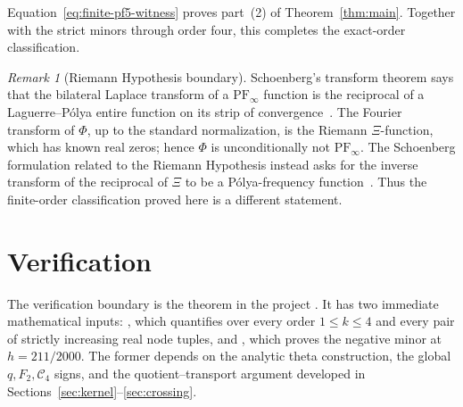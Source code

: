 \documentclass[11pt]{article}
\theoremstyle{remark}
\newtheorem{remark}[theorem]{Remark}
\newcommand{\Cfour}{\mathcal{C}_4}
\newcommand{\PF}{\mathrm{PF}}
\numberwithin{equation}{section}
\begin{document}
Equation~\eqref{eq:finite-pf5-witness} proves part~(2) of
Theorem~\ref{thm:main}. Together with the strict minors through order four,
this completes the exact-order classification.

\begin{remark}[Riemann Hypothesis boundary]
Schoenberg's transform theorem says that the bilateral Laplace transform of a
\(\PF_\infty\) function is the reciprocal of a Laguerre--P\'olya entire function
on its strip of convergence~\cite{schoenberg-ii,belton}. The Fourier transform
of \(\Phi\), up to the standard normalization, is the Riemann \(\Xi\)-function,
which has known real zeros; hence \(\Phi\) is unconditionally not
\(\PF_\infty\). The Schoenberg formulation related to the Riemann Hypothesis
instead asks for the inverse transform of the reciprocal of \(\Xi\) to be a
P\'olya-frequency function~\cite{grochenig}. Thus the finite-order
classification proved here is a different statement.
\end{remark}
\section{Verification}\label{sec:reproducibility}

The verification boundary is the theorem
 in the project
. It has two immediate mathematical inputs:
, which quantifies over every
order \(1\leq k\leq4\) and every pair of strictly increasing real node tuples,
and , which proves
the negative minor at \(h=211/2000\). The former depends on the analytic theta
construction, the global \(q,F_2,\Cfour\) signs, and the quotient--transport
argument developed in Sections~\ref{sec:kernel}--\ref{sec:crossing}.
\end{document}
